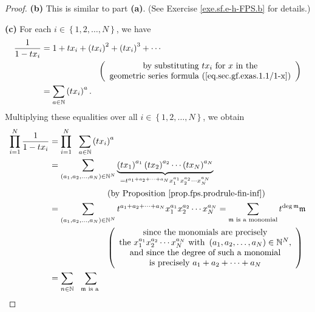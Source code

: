 \begin{proof}
\textbf{(b)} This is similar to part \textbf{(a)}. (See Exercise
\ref{exe.sf.e-h-FPS.b} for details.) \medskip

\textbf{(c)} For each $i\in\left\{  1,2,\ldots,N\right\}  $, we have%
\begin{align*}
\dfrac{1}{1-tx_{i}}  &  =1+tx_{i}+\left(  tx_{i}\right)  ^{2}+\left(
tx_{i}\right)  ^{3}+\cdots\\
&  \ \ \ \ \ \ \ \ \ \ \ \ \ \ \ \ \ \ \ \ \left(
\begin{array}
[c]{c}%
\text{by substituting }tx_{i}\text{ for }x\text{ in the}\\
\text{geometric series formula (\ref{eq.sec.gf.exas.1.1/1-x})}%
\end{array}
\right) \\
&  =\sum_{a\in\mathbb{N}}\left(  tx_{i}\right)  ^{a}.
\end{align*}
Multiplying these equalities over all $i\in\left\{  1,2,\ldots,N\right\}  $,
we obtain%
\begin{align*}
\prod_{i=1}^{N}\dfrac{1}{1-tx_{i}}  &  =\prod_{i=1}^{N}\ \ \sum_{a\in
\mathbb{N}}\left(  tx_{i}\right)  ^{a}\\
&  =\sum_{\left(  a_{1},a_{2},\ldots,a_{N}\right)  \in\mathbb{N}^{N}%
}\underbrace{\left(  tx_{1}\right)  ^{a_{1}}\left(  tx_{2}\right)  ^{a_{2}%
}\cdots\left(  tx_{N}\right)  ^{a_{N}}}_{=t^{a_{1}+a_{2}+\cdots+a_{N}}%
x_{1}^{a_{1}}x_{2}^{a_{2}}\cdots x_{N}^{a_{N}}}\\
&  \ \ \ \ \ \ \ \ \ \ \ \ \ \ \ \ \ \ \ \ \left(  \text{by Proposition
\ref{prop.fps.prodrule-fin-inf}}\right) \\
&  =\sum_{\left(  a_{1},a_{2},\ldots,a_{N}\right)  \in\mathbb{N}^{N}}%
t^{a_{1}+a_{2}+\cdots+a_{N}}x_{1}^{a_{1}}x_{2}^{a_{2}}\cdots x_{N}^{a_{N}%
}=\sum_{\mathfrak{m}\text{ is a monomial}}t^{\deg\mathfrak{m}}\mathfrak{m}\\
&  \ \ \ \ \ \ \ \ \ \ \ \ \ \ \ \ \ \ \ \ \left(
\begin{array}
[c]{c}%
\text{since the monomials are precisely}\\
\text{the }x_{1}^{a_{1}}x_{2}^{a_{2}}\cdots x_{N}^{a_{N}}\text{ with }\left(
a_{1},a_{2},\ldots,a_{N}\right)  \in\mathbb{N}^{N}\text{,}\\
\text{and since the degree of such a monomial}\\
\text{is precisely }a_{1}+a_{2}+\cdots+a_{N}%
\end{array}
\right) \\
&  =\sum_{n\in\mathbb{N}}\ \ \sum_{\substack{\mathfrak{m}\text{ is a
}}}
\end{align*}
\end{proof}
